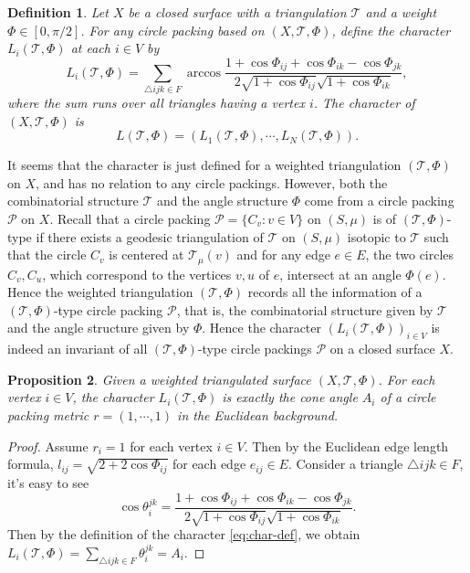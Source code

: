 \documentclass[12pt]{amsart}
\numberwithin{equation}{section}
\newtheorem{prop}{Proposition}[section]
\newtheorem{defi}[prop]{Definition}
\begin{document}
\begin{defi}\label{def:character}
Let $X$ be a closed surface with a triangulation $\mathcal{T}$ and a weight $\Phi \in [0,\pi/2]$. For any
circle packing based on $(X,\mathcal{T},\Phi)$, define the character $L_i(\mathcal{T},\Phi)$ at each $i \in V$ by
\begin{equation}\label{eq:char-def}
L_i(\mathcal{T},\Phi) = \sum_{\triangle ijk \in F} \arccos \frac{1 + \cos\Phi_{ij} + \cos\Phi_{ik} - \cos\Phi_{jk}}{2\sqrt{1 + \cos\Phi_{ij}}\sqrt{1 + \cos\Phi_{ik}}},
\end{equation}
where the sum runs over all triangles having a vertex $i$. The character of $(X,\mathcal{T},\Phi)$ is
\[
L(\mathcal{T},\Phi) = (L_1(\mathcal{T},\Phi), \cdots, L_N(\mathcal{T},\Phi)).
\]
\end{defi}

It seems that the character is just defined for a weighted triangulation $(\mathcal{T},\Phi)$ on $X$, and has no relation
to any circle packings. However, both the combinatorial structure $\mathcal{T}$ and the angle structure $\Phi$ come
from a circle packing $\mathcal{P}$ on $X$. Recall that a circle packing $\mathcal{P} = \{C_v : v \in V\}$ on $(S,\mu)$ is of $(\mathcal{T},\Phi)$-type if
there exists a geodesic triangulation of $\mathcal{T}$ on $(S,\mu)$ isotopic to $\mathcal{T}$ such that the circle $C_v$ is centered at $\mathcal{T}_\mu(v)$
and for any edge $e \in E$, the two circles $C_v, C_u$, which correspond to the vertices $v,u$ of $e$, intersect at an
angle $\Phi(e)$. Hence the weighted triangulation $(\mathcal{T},\Phi)$ records all the information of a $(\mathcal{T},\Phi)$-type circle
packing $\mathcal{P}$, that is, the combinatorial structure given by $\mathcal{T}$ and the angle structure given by $\Phi$. Hence
the character $(L_i(\mathcal{T},\Phi))_{i \in V}$ is indeed an invariant of all $(\mathcal{T},\Phi)$-type circle packings $\mathcal{P}$ on a closed surface
$X$.

\begin{prop}\label{prop:3.3}
Given a weighted triangulated surface $(X,\mathcal{T},\Phi)$. For each vertex $i \in V$, the
character $L_i(\mathcal{T},\Phi)$ is exactly the cone angle $A_i$ of a circle packing metric $r = (1,\cdots, 1)$ in the Euclidean
background.
\end{prop}

\begin{proof}
Assume $r_i = 1$ for each vertex $i \in V$. Then by the Euclidean edge length formula, $l_{ij} = \sqrt{2 + 2\cos\Phi_{ij}}$ for each edge $e_{ij} \in E$.
Consider a triangle $\triangle ijk \in F$, it's easy to see
\[
\cos\theta_i^{jk} = \frac{1 + \cos\Phi_{ij} + \cos\Phi_{ik} - \cos\Phi_{jk}}{2\sqrt{1 + \cos\Phi_{ij}}\sqrt{1 + \cos\Phi_{ik}}}.
\]
Then by the definition of the character \eqref{eq:char-def}, we obtain $L_i(\mathcal{T},\Phi) = \sum_{\triangle ijk \in F} \theta_i^{jk} = A_i$.
\end{proof}
\end{document}
